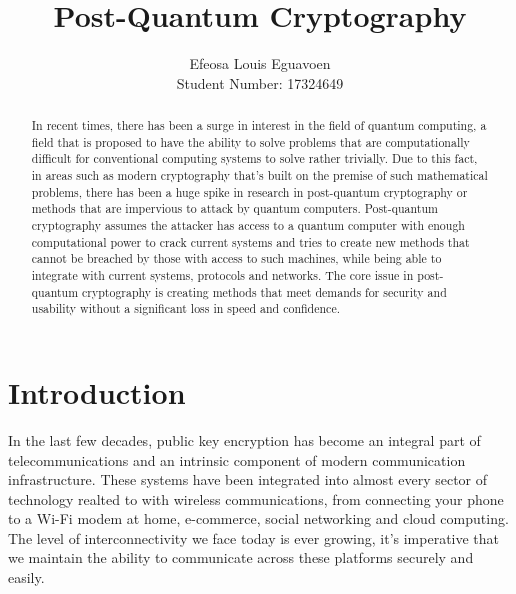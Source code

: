 \documentclass[10pt,a4paper]{IEEEtran}
\author{Efeosa Louis Eguavoen \\ Student Number: 
17324649}
\title{Post-Quantum Cryptography}
\begin{document}
\maketitle
\begin{abstract}
In recent times, there has been a surge in interest in the field of quantum computing, a field that is proposed to have the ability to solve problems that are computationally difficult for conventional computing systems to solve rather trivially. Due to this fact, in areas such as modern cryptography that's built on the premise of such mathematical problems, there has been a huge spike in research in post-quantum cryptography or methods that are impervious to attack by quantum computers. Post-quantum cryptography assumes the attacker has access to a quantum computer with enough computational power to crack current systems and tries to create new methods that cannot be breached by those with access to such machines, while being able to integrate with current systems, protocols and networks. The core issue in post-quantum cryptography is creating methods that meet demands for security and usability without a significant loss in speed and confidence.
\end{abstract} 
\section{Introduction}
In the last few decades, public key encryption has become an integral part of telecommunications and an intrinsic component of modern communication infrastructure. These systems have been integrated into almost every sector of technology realted to with wireless communications, from connecting your phone to a Wi-Fi modem at home, e-commerce, social networking and cloud computing. The level of interconnectivity we face today is ever growing, it's imperative that we maintain the ability to communicate across these platforms securely and easily.
\newline
\newline
\end{document}
